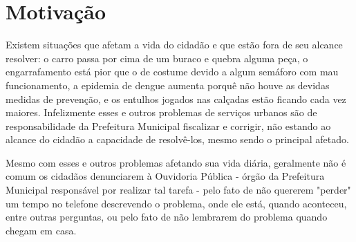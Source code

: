 \documentclass[
	12pt,				%
	openright,			%
	oneside,			%
	a4paper,			%
	english,			%
	french,				%
	spanish,			%
	brazil				%
	]{abntex2}
\begin{document}
%
%
%
%
\tableofcontents*
\cleardoublepage
%
%
%
%

\chapter[Motivação]{Motivação}

Existem situações que afetam a vida do cidadão e que estão fora de seu alcance resolver: o carro passa por cima de um buraco e quebra alguma peça, o engarrafamento está pior que o de costume devido a algum semáforo com mau funcionamento, a epidemia de dengue aumenta porquê não houve as devidas medidas de prevenção, e os entulhos jogados nas calçadas estão ficando cada vez maiores. Infelizmente esses e outros problemas de serviços urbanos são de responsabilidade da Prefeitura Municipal fiscalizar e corrigir, não estando ao alcance do cidadão a capacidade de resolvê-los, mesmo sendo o principal afetado.

Mesmo com esses e outros problemas afetando sua vida diária, geralmente não é comum os cidadãos denunciarem à Ouvidoria Pública - órgão da Prefeitura Municipal responsável por realizar tal tarefa - pelo fato de não quererem "perder" um tempo no telefone descrevendo o problema, onde ele está, quando aconteceu, entre outras perguntas, ou pelo fato de não lembrarem do problema quando chegam em casa.
\end{document}

